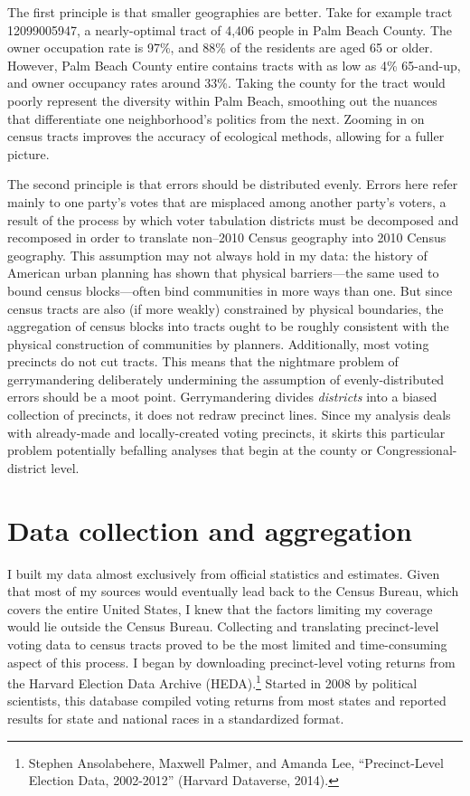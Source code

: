 \documentclass[12pt,oneside]{psthesis}
\begin{document}
The first principle is that smaller geographies are better.
Take for example tract 12099005947, a nearly-optimal tract of 4,406 people in Palm Beach County.
The owner occupation rate is 97\%, and 88\% of the residents are aged 65 or older.
However, Palm Beach County entire contains tracts with as low as 4\% 65-and-up, and owner occupancy rates around 33\%.
Taking the county for the tract would poorly represent the diversity within Palm Beach, smoothing out the nuances that differentiate one neighborhood's politics from the next.
Zooming in on census tracts improves the accuracy of ecological methods, allowing for a fuller picture.

The second principle is that errors should be distributed evenly.
Errors here refer mainly to one party's votes that are misplaced among another party's voters, a result of the process by which voter tabulation districts must be decomposed and recomposed in order to translate non--2010 Census geography into 2010 Census geography.
This assumption may not always hold in my data: the history of American urban planning has shown that physical barriers---the same used to bound census blocks---often bind communities in more ways than one.
But since census tracts are also (if more weakly) constrained by physical boundaries, the aggregation of census blocks into tracts ought to be roughly consistent with the physical construction of communities by planners.
Additionally, most voting precincts do not cut tracts.
This means that the nightmare problem of gerrymandering deliberately undermining the assumption of evenly-distributed errors should be a moot point.
Gerrymandering divides \emph{districts} into a biased collection of precincts, it does not redraw precinct lines.
Since my analysis deals with already-made and locally-created voting precincts, it skirts this particular problem potentially befalling analyses that begin at the county or Congressional-district level.

\hypertarget{aggregation}{%
\section{Data collection and aggregation}\label{aggregation}}

I built my data almost exclusively from official statistics and estimates.
Given that most of my sources would eventually lead back to the Census Bureau, which covers the entire United States, I knew that the factors limiting my coverage would lie outside the Census Bureau.
Collecting and translating precinct-level voting data to census tracts proved to be the most limited and time-consuming aspect of this process.
I began by downloading precinct-level voting returns from the Harvard Election Data Archive (HEDA).\footnote{Stephen Ansolabehere, Maxwell Palmer, and Amanda Lee, ``Precinct-Level Election Data, 2002-2012'' (Harvard Dataverse, 2014).}
Started in 2008 by political scientists, this database compiled voting returns from most states and reported results for state and national races in a standardized format.
\end{document}

